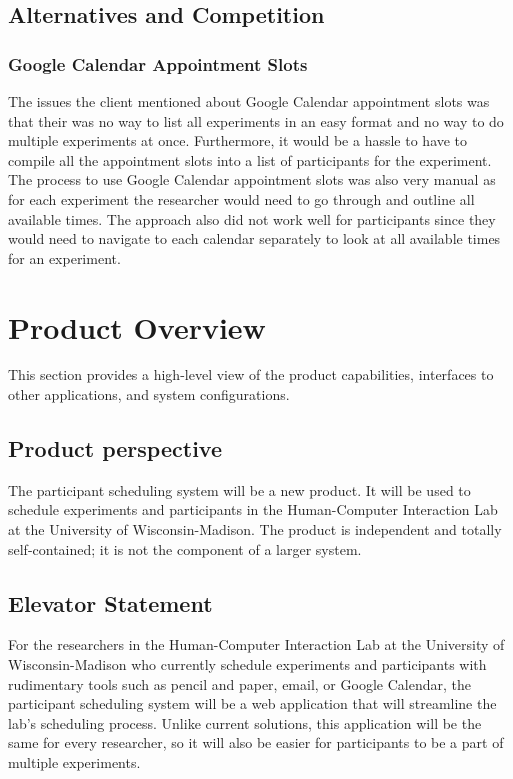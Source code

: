 \subsection{Alternatives and Competition}
\subsubsection{Google Calendar Appointment Slots}
The issues the client mentioned about Google Calendar appointment slots was that their was no way to list all experiments in an easy format and no way to do multiple experiments at once. Furthermore, it would be a hassle to have to compile all the appointment slots into a list of participants for the experiment. The process to use Google Calendar appointment slots was also very manual as for each experiment the researcher would need to go through and outline all available times. The approach also did not work well for participants since they would need to navigate to each calendar separately to look at all available times for an experiment.

\section{Product Overview}
This section provides a high-level view of the product capabilities, interfaces to other applications, and system configurations.

\subsection{Product perspective}
The participant scheduling system will be a new product. It will be used to schedule experiments and participants in the Human-Computer Interaction Lab at the University of Wisconsin-Madison. The product is independent and totally self-contained; it is not the component of a larger system.

\subsection{Elevator Statement}
For the researchers in the Human-Computer Interaction Lab at the University of Wisconsin-Madison who currently schedule experiments and participants with rudimentary tools such as pencil and paper, email, or Google Calendar, the participant scheduling system will be a web application that will streamline the lab's scheduling process. Unlike current solutions, this application will be the same for every researcher, so it will also be easier for participants to be a part of multiple experiments.

